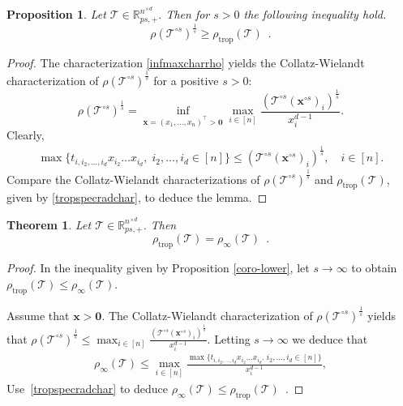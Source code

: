 \documentclass{amsart}
\newcommand{\R}{\mathbb{R}}
\newcommand{\x}{\mathbf{x}}
\newcommand{\0}{\mathbf{0}}
\newcommand{\1}{\mathbf{1}}
\newcommand{\cT}{\mathcal{T}}
\newcommand{\trans}{^\top}
\newcommand{\trop}{\mathrm{trop}}
\newtheorem{theorem}[theo]{Theorem}
\newtheorem{proposition}[theo]{Proposition}
\theoremstyle{remark}
\numberwithin{equation}{section} %
\renewcommand{\geq}{\geqslant}
\renewcommand{\leq}{\leqslant}
\renewcommand{\le}{\leqslant}
\begin{document}
%
%
\begin{proposition}\label{coro-lower}
Let $\cT\in \R_{ps,+}^{n^{\times d}}$.  Then for $s>0$  the following inequality hold.
\[
\rho(\cT^{\circ s})^{\frac{1}{s}}\geq \rho_{\trop}(\cT) \enspace .
\]
\end{proposition}
\begin{proof}
 {{The characterization \eqref{infmaxcharrho} yields the Collatz-Wielandt characterization of $\rho(\cT^{\circ s})^{\frac{1}{s}}$ for a positive $s>0$:
 \[\rho(\cT^{\circ s})^{\frac{1}{s}}= \inf_{\x=(x_1,\ldots,x_n)\trans>\0}\max_{i\in[n]} \frac{(\cT^{\circ s}(\x^{\circ s})_i)^{\frac{1}{s}}}{x_i^{d-1}}.\]
 Clearly,
\begin{eqnarray*}\label{basintropchar}
\max\{t_{i,i_2,\ldots,i_d}x_{i_2}\ldots x_{i_d},\;i_2,\ldots,i_d\in[n]\}\le (\cT^{\circ s}(\x^{\circ s})_i)^{\frac{1}{s}}, \quad i\in[n]. 
\end{eqnarray*} 
Compare the Collatz-Wielandt characterizations of $\rho(\cT^{\circ s})^{\frac{1}{s}}$  and $\rho_{\trop}(\cT)$, given by \eqref{tropspecradchar}, to deduce the lemma.}}
 \end{proof}

 \begin{theorem}\label{tropspecradthm}  Let $\cT\in \R_{ps,+}^{n^{\times d}}$.  Then
\[
\rho_{\trop}(\cT) = \rho_\infty(\cT) \enspace .
\]
%
%
%
%
%
%
%
%
%
%
%
%
%
 \end{theorem}
 \begin{proof}
   {{In the inequality given by Proposition \eqref{coro-lower}, let $s\to\infty$ to obtain $\rho_{\trop}(\cT)\le \rho_{\infty}(\cT)$.

Assume that $\x>\0$.  The Collatz-Wielandt characterization of $\rho(\cT^{\circ s})^{\frac{1}{s}}$ yields that $\rho(\cT^{\circ s})^{\frac{1}{s}}\le \max_{i\in[n]} \frac{(\cT^{\circ s}(\x^{\circ s})_i)^{\frac{1}{s}}}{x_i^{d-1}}$.
 Letting $s\to\infty$ we deduce that
 \begin{eqnarray*}\label{uptorpbound}
 \rho_{\infty}(\cT)\le  \max_{i\in[n]} \frac{\max\{t_{i,i_2,\ldots,i_d}x_{i_2}\ldots x_{i_d}.\;i_2,\ldots,i_d\in[n]\}}{x_i^{d-1}},
 \end{eqnarray*}
Use~\eqref{tropspecradchar} to deduce
$\rho_\infty(\cT)\leq \rho_\trop(\cT) \enspace$.}}

 \end{proof}

%
%
%
%
%
%
%
%
%
%
%
%
%

%

%
%
%
%
%
%
\end{document}
